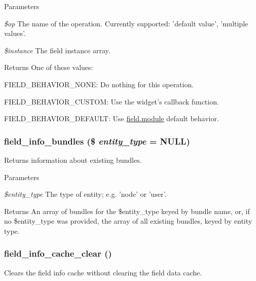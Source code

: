 \begin{DoxyParams}{Parameters}
\item[{\em \$op}]The name of the operation. Currently supported: 'default value', 'multiple values'. \item[{\em \$instance}]The field instance array.\end{DoxyParams}
\begin{DoxyReturn}{Returns}
One of these values:
\begin{DoxyItemize}
\item FIELD\_\-BEHAVIOR\_\-NONE: Do nothing for this operation.
\item FIELD\_\-BEHAVIOR\_\-CUSTOM: Use the widget's callback function.
\item FIELD\_\-BEHAVIOR\_\-DEFAULT: Use \hyperlink{field_8module}{field.module} default behavior. 
\end{DoxyItemize}
\end{DoxyReturn}
\hypertarget{group__field__info_ga256e760ea91818bb5463deb91c8f5c57}{
\subsubsection[{field\_\-info\_\-bundles}]{\setlength{\rightskip}{0pt plus 5cm}field\_\-info\_\-bundles (\$ {\em entity\_\-type} = {\ttfamily NULL})}}
\label{group__field__info_ga256e760ea91818bb5463deb91c8f5c57}
Returns information about existing bundles.


\begin{DoxyParams}{Parameters}
\item[{\em \$entity\_\-type}]The type of entity; e.g. 'node' or 'user'.\end{DoxyParams}
\begin{DoxyReturn}{Returns}
An array of bundles for the \$entity\_\-type keyed by bundle name, or, if no \$entity\_\-type was provided, the array of all existing bundles, keyed by entity type. 
\end{DoxyReturn}
\hypertarget{group__field__info_ga40cf38b714f91269818e2e65c860c794}{
\subsubsection[{field\_\-info\_\-cache\_\-clear}]{\setlength{\rightskip}{0pt plus 5cm}field\_\-info\_\-cache\_\-clear ()}}
\label{group__field__info_ga40cf38b714f91269818e2e65c860c794}
Clears the field info cache without clearing the field data cache.

